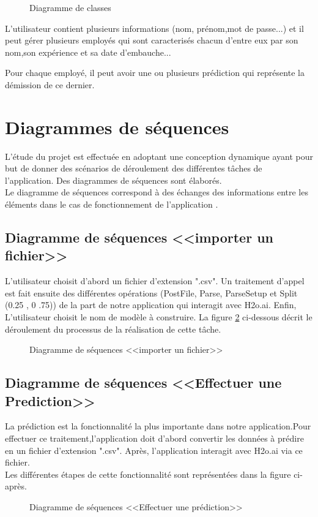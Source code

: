        \newpage
         \begin{figure}[htpb]
\centering
{}
\caption{Diagramme de classes}
\label{fig:Diagramme de classes}
\end{figure} 
L'utilisateur contient plusieurs informations (nom, prénom,mot de passe...) et il peut gérer plusieurs employés qui sont caracterisés chacun d'entre eux par son nom,son expérience et sa date d'embauche...

Pour chaque employé, il peut avoir une ou plusieurs prédiction qui représente la démission de ce dernier.

\newpage
  \section{Diagrammes de séquences} 
  L’étude du projet est effectuée en adoptant une conception dynamique ayant pour but de donner des scénarios de déroulement des différentes tâches de l’application. Des diagrammes de séquences sont élaborés.\\
  Le diagramme de séquences correspond à des échanges des informations entre les éléments dans le cas de fonctionnement de l’application \cite{DiagSeq}.
   \subsection{Diagramme de séquences <<importer un fichier>>}
   L’utilisateur choisit d'abord un fichier d’extension ".csv". Un traitement d’appel est fait ensuite des différentes opérations (PostFile, Parse, ParseSetup et Split (0.25 , 0 .75)) de la part de notre application qui interagit avec H2o.ai. Enfin, L’utilisateur choisit le nom de modèle à construire.
La figure \ref{fig:Diagramme de séquences <<importer un fichier>>} ci-dessous décrit le déroulement du processus de la réalisation de cette tâche.
         \begin{figure}[htpb]
\centering
{}
\caption{Diagramme de séquences <<importer un fichier>>}
\label{fig:Diagramme de séquences <<importer un fichier>>}
\end{figure}
\newpage

 \subsection{Diagramme de séquences <<Effectuer une Prediction>>}
 La prédiction est la fonctionnalité la plus importante dans notre application.Pour effectuer ce traitement,l'application doit d'abord convertir les données à prédire en un fichier d'extension ".csv". Après, l'application interagit avec H2o.ai via ce fichier.\\
 Les différentes étapes de cette fonctionnalité sont représentées dans la figure ci-après.
         \begin{figure}[htpb]
\centering
{}
\caption{Diagramme de séquences <<Effectuer une prédiction>>}
\label{fig:Diagramme de séquences <<Effectuer une Prediction>>}
\end{figure}

